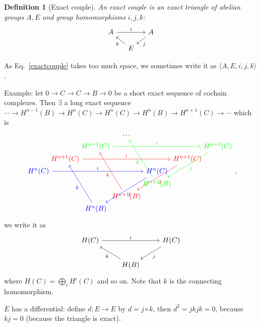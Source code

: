 \documentclass{article}
\theoremstyle{mystyle}
\newtheorem*{definition}{Definition}%
\theoremstyle{remark}
\numberwithin{equation}{section}
\begin{document}
\begin{definition}[Exact couple]
An \emph{exact couple} is an exact triangle of abelian groups $A,E$ and group homomorphisms $i,j,k$:
\begin{equation}\label{exactcouple}
\begin{tikzcd}[column sep = small, row sep = small]
A\ar[rr,"i"] &&A\ar[dl,"j"]\\
&E\ar[ul,"k"]&
\end{tikzcd}
\end{equation}
\end{definition}
 As Eq.~\eqref{exactcouple} takes too much space, we sometimes write it as $\langle A,E,i,j,k\rangle$. 

Example: let  $0\rightarrow {C}\rightarrow {C}\rightarrow {B}\rightarrow 0$ be a short exact sequence of cochain complexes. Then $\exists$ a long exact sequence $\cdots \rightarrow H^{n-1}({B})\rightarrow H^n({C})\rightarrow H^n({C})\rightarrow H^n({B})\rightarrow H^{n+1}({C})\rightarrow \cdots$
which is
\begin{equation}\label{rolled}
\begin{tikzcd}[column sep = -0.2cm, row sep = 0.cm]
&&&\cdots&&&\\
&&\textcolor{green}{H^{n+2}({C})}\ar[rrrr,green,"i"]&&&&\color{green}{H^{n+2}({C})}\ar[ddddll,green,"j"]\\
&\color{red}{H^{n+1}({C})}\ar[rrrr,red,"i"]&&&&\color{red}{H^{n+1}({C})\ar[ddddll,red,"j"]}&\\
\color{blue}{H^n({C})}\ar[rrrr,blue,"i"]&&&&\color{blue}{H^n({C})}\ar[ddddll,blue,"j"]&&\\
&&&&&&\\
&&&&\textcolor{green}{H^{n+2}({B})}\ar[uuuuul,green,"k"]&&\\
&&&\textcolor{red}{H^{n+1}({B})}\ar[uuuuul,red,"k"]&&&\\
&&\textcolor{blue}{H^n({B})}\ar[uuuuul,blue,"k"]&&&&
\end{tikzcd},
\end{equation}
we write it as
\begin{equation}\label{exactcouple}
\begin{tikzcd}
H({C})\ar[rr,"i"] &&H({C}) \ar[dl,"j"]\\
&H({B})\ar[ul,"k"]&
\end{tikzcd}
\end{equation}
where $H({C}) = \bigoplus_i H^i({C})$ and so on. Note that $k$ is the connecting homomorphism.


$E$ has a differential: define $d\colon E\rightarrow E$ by $d=j\circ k$, then $d^2 = jkjk=0$, because $kj=0$ (because the triangle is exact).  
\end{document}
